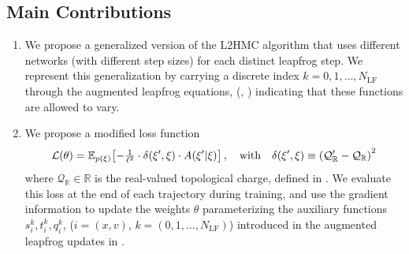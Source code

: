 \documentclass{article} %
\begin{document}
\subsection{\label{subsec:main_contributions}Main Contributions}
\begin{enumerate}
   \item We propose a generalized version of the L2HMC algorithm that uses different networks (with different step
      sizes) for each distinct leapfrog step.
      We represent this generalization by carrying a discrete index \(k = 0, 1, \ldots, N_{\mathrm{LF}}\) through the
      augmented leapfrog equations, (, ) indicating that
      these functions are allowed to vary.
   \item We propose a modified loss function
      \begin{equation}
          \mathcal{L}(\theta) = \mathbb{E}_{p(\xi)}{%
              \left[-\tfrac{1}{\ell^{2}}\cdot\delta(\xi^{\prime}, \xi)\cdot A(\xi^{\prime}|\xi)\right],\quad\text{with}\quad%
          \delta(\xi^{\prime}, \xi) \equiv
      {\left(\mathcal{Q}_{\mathbb{R}}^{\prime}-\mathcal{Q}_{\mathbb{R}}\right)}^{2}
          }
      \end{equation}
      where \(\mathcal{Q}_{\mathbb{R}}\in\mathbb{R}\) is the real-valued topological charge, defined in .
      We evaluate this loss at the end of each trajectory during training, and use the gradient information to update
      the weights \(\theta\) parameterizing the auxiliary functions \(s^{k}_{i}, t^{k}_{i}, q^{k}_{i}\), (\(i =(x, v)\), \(k = (0, 1, \ldots, N_{\mathrm{LF}})\))
      introduced in the augmented leapfrog updates in .

\end{enumerate}
\end{document}
